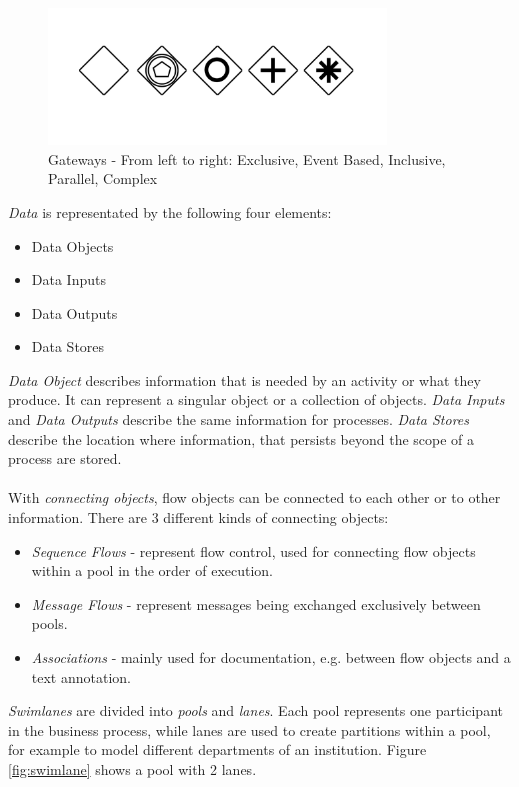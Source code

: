\begin{figure}[htbp]
	\centering
		\includegraphics[width=0.8\textwidth]{images/gateways.png}
	\caption{Gateways - From left to right: Exclusive, Event Based, Inclusive, Parallel, Complex}
	\label{fig:gateways}
\end{figure}



\textit{Data} is representated by the following four elements:
\begin{itemize}
	\item Data Objects
	\item Data Inputs
	\item Data Outputs
	\item Data Stores
\end{itemize}
\textit{Data Object} describes information that is needed by an activity or what they produce. It can represent a singular object or a collection of objects. \textit{Data Inputs} and \textit{Data Outputs} describe the same information for processes. \textit{Data Stores} describe the location where information, that persists beyond the scope of a process are stored.\\\\
With \textit{connecting objects}, flow objects can be connected to each other or to other information. There are 3 different kinds of connecting objects:
\begin{itemize}
	\item \textit{Sequence Flows} - represent flow control, used for connecting flow objects within a pool in the order of execution.
	\item \textit{Message Flows} - represent messages being exchanged exclusively between pools.
	\item \textit{Associations} -  mainly used for documentation, e.g. between flow objects and a text annotation.
\end{itemize}
\textit{Swimlanes} are divided into \textit{pools} and \textit{lanes}. Each pool represents one participant in the business process, while lanes are used to create partitions within a pool, for example to model different departments of an institution. Figure \ref{fig:swimlane} shows a pool with 2 lanes.\\\\
